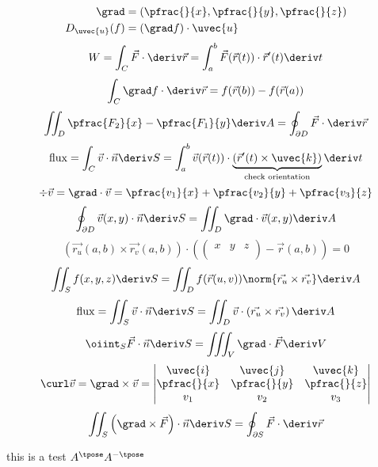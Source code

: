 \documentclass[10pt, a4paper]{article}
\begin{document}
    \begin{align*}
        \grad &= \left(\pfrac{}{x}, \pfrac{}{y}, \pfrac{}{z}\right) \\
        D_{\uvec{u}}(f) &= \left(\grad f\right) \cdot \uvec{u}
    \end{align*}
    \[
        W = \int_{C} \vec{F} \cdot \deriv \vec{r}
        = \int_{a}^{b} \vec{F}(\vec{r}(t)) \cdot \vec{r}'(t) \deriv t
    \]
    \[
        \int_{C} \grad f \cdot \deriv \vec{r} = f(\vec{r}(b)) - f(\vec{r}(a))
    \]
    \[
        \iint_{D} \pfrac{F_2}{x} - \pfrac{F_1}{y} \deriv A = \oint_{\partial D} \vec{F} \cdot \deriv \vec{r}
    \]
    \[
        \mathrm{flux} = \int_{C} \vec{v} \cdot \vec{n} \deriv S 
        = \int_{a}^{b} \vec{v}(\vec{r}(t)) \cdot
        \underbrace{
            \left( \vec{r} '(t) \times \uvec{k} \right)
        }_{\text{check orientation}}
        \deriv t
    \]
    \[
        \div \vec{v} = \grad \cdot \vec{v} = \pfrac{v_1}{x} + \pfrac{v_2}{y} + \pfrac{v_3}{z}
    \]
    \[
        \oint_{\partial D} \vec{v}(x, y) \cdot \vec{n} \deriv S
        = \iint_{D} \grad \cdot \vec{v}(x, y) \deriv A
    \]
    \[
        \left(\vec{r_{u}}(a, b) \times \vec{r_{v}}(a, b)\right) \cdot
        \left( \begin{pmatrix}
            x & y & z \\ 
        \end{pmatrix}
        - \vec{r}(a, b)
        \right) = 0
    \]
    \[
        \iint_{S} f(x, y, z) \deriv S =
        \iint_{D} f(\vec{r}(u, v)) \norm{\vec{r_{u}} \times \vec{r_{v}}} \deriv A
    \]
    \[
        \mathrm{flux} = \iint_{S} \vec{v} \cdot \vec{n} \deriv S =
        \iint_{D} \vec{v} \cdot \left(\vec{r_{u}} \times \vec{r_{v}}\right) \deriv A
    \]
    \[
        \oiint_{S} \vec{F} \cdot \vec{n} \deriv S = 
        \iiint_{V} \grad \cdot \vec{F} \deriv V
    \]
    \[
        \curl \vec{v} = \grad \times \vec{v} = \begin{vmatrix}
            \uvec{i} & \uvec{j} & \uvec{k} \\
            \pfrac{}{x} & \pfrac{}{y} & \pfrac{}{z} \\
            v_1 & v_2 & v_3
        \end{vmatrix}
    \]
    \[
        \iint_{S} \left(\grad \times \vec{F}\right) \cdot \vec{n} \deriv S
        = \oint_{\partial S} \vec{F} \cdot \deriv \vec{r}
    \]
    
    this is a test \(A^{\tpose} A^{-\tpose}\)
\end{document}

